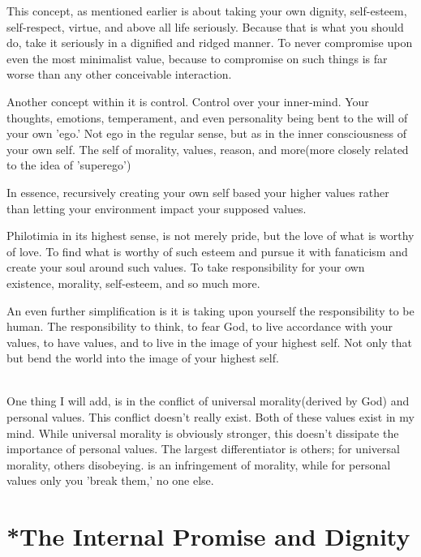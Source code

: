 \par This concept, as mentioned earlier is about taking your own dignity, self-esteem, self-respect, virtue, and above all life seriously. Because that is what you should do, take it seriously in a dignified and ridged manner. To never compromise upon even the most minimalist value, because to compromise on such things is far worse than any other conceivable interaction.
\par Another concept within it is control. Control over your inner-mind. Your thoughts, emotions, temperament, and even personality being bent to the will of your own 'ego.' Not ego in the regular sense, but as in the inner consciousness of your own self. The self of morality, values, reason, and more(more closely related to the idea of 'superego')
\par In essence, recursively creating your own self based your higher values rather than letting your environment impact your supposed values.
\par Philotimia in its highest sense, is not merely pride, but the love of what is worthy of love. To find what is worthy of such esteem and pursue it with fanaticism and create your soul around such values. To take responsibility for your own existence, morality, self-esteem, and so much more.
\par An even further simplification is it is taking upon yourself the responsibility to be human. The responsibility to think, to fear God, to live accordance with your values, to have values, and to live in the image of your highest self. Not only that but bend the world into the image of your highest self.
\\
\\
\par One thing I will add, is in the conflict of universal morality(derived by God) and personal values. This conflict doesn't really exist. Both of these values exist in my mind. While universal morality is obviously stronger, this doesn't dissipate the importance of personal values. The largest differentiator is others; for universal morality, others disobeying. is an infringement of morality, while for personal values only you 'break them,' no one else.

\section{*The Internal Promise and Dignity}
